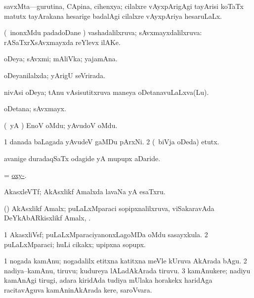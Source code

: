 \bentry
{}
\gl{\gu}
\bmng
savxMta---gurutina, CApina, cihenxya; cilalxre vAyxpArigAgi tayArisi koTaTx matutx tayArakana hesarige badalAgi cilalxre vAyxpAriya hesaruLaLx. 
\emng
\eentry

\bentry
{}
\gl{\gu}
\bmng
(\sA\ inonxMdu padadoDane \parx) vashadalilxruva; sAvxmayxdalilxruva:  rASaTxrXsAvxmayxda reYlevx ilAKe. 
\emng
\eentry

\bentry
{}
\gl{\nA}
\bmng
oDeya; sAvxmi; mAliVka; yajamAna. 
\emng
\eentry

\bentry
{}
\gl{\nA}
\bmng
oDeyanilalxda; yArigU seVrirada. 
\emng
\eentry

\bentry
{}
\gl{\nA}
\bmng
nivAsi oDeya; tAnu vAsisutitxruva maneya oDetanavuLaLxva(Lu). 
\emng
\eentry

\bentry
{}
\gl{\nA}
\bmng
oDetana; sAvxmayx. 
\emng
\eentry

\bentry
{}
\gl{\nA}
\bmng
(\AmA\ yA \pArxM) EnoV oMdu; yAvudoV oMdu. 
\emng
\eentry

\bentry
{}
\gl{\nA}
\bmng
\bnum
\num{1} danada baLagada yAvudeV gaMDu pArxNi. 
\num{2} (\kanmu\ biVja oDeda) etutx. 
\enum
\emng

\noindent
\gl{\pagu}
\bmng
{} avanige duradaqSaTx odagide yA mupupx aDaride. 
\emng
\eentry

\bentry
{}
\gl{\sapUpa}
\bmng
= \hyperlink{oxy-}{oxy-}. 
\emng
\eentry

\bentry
{}
\gl{\nA}
\bmng
AkasxleVTf; AkAsxlikf Amalxda lavaNa yA esaTxru. 
\emng
\eentry

\bentry
{}
\gl{\nA}
\bmng
(\ravi) AkAsxlikf Amalx; puLaLxMparaci sopipxnalilxruva, viSakaravAda DeYkAbARkisxlikf Amalx, . 
\emng
\eentry

\bentry
{}
\gl{\nA}
\bmng
\bnum
\num{1} AkasxliVsf; puLaLxMparaciyanonxLagoMDa oMdu sasayxkula. 
\num{2} puLaLxMparaci; huLi cikakx; upipxna sopupx. 
\enum
\emng
\eentry

\bentry
{}
\gl{\nA}
\bmng
\bnum
\num{1} nogada kamAnu; nogadalilx etitxna katitxna meVle kUruva  AkArada bAgu.  
\num{2} nadiya--kamAnu, tiruvu; kudureya lALadAkArada tiruvu. 
\num{3} kamAnukere; nadiyu kamAnAgi tirugi, adara kiridAda tudiya mUlaka horakekx haridAga racitavAguva kamAninAkArada kere, saroVvara. 
\enum
\emng
\eentry

